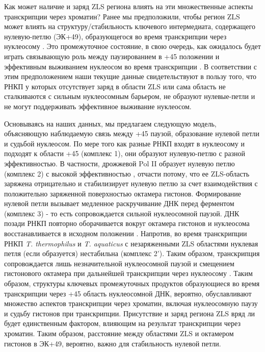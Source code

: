     Как может наличие и заряд ZLS региона влиять на эти множественные аспекты транскрипции через хроматин? Ранее мы предположили, чтобы регион ZLS может влиять на структуру/стабильность ключевого интермедиата, содержащего нулевую-петлю (ЭК+49), образующегося во время транскрипции через нуклеосому \cite{kulaeva_mechanism_2009}. Это промежуточное состояние, в свою очередь, как ожидалось будет играть связывающую роль между паузированием в +45 положении и эффективным выживанием нуклеосом во время транскрипции \cite{hsieh_histone_2010}. В соответствии с этим предположением наши текущие данные свидетельствуют в пользу того, что РНКП у которых отсутствует заряд в области ZLS или сама область не сталкиваются с сильным нуклеосомным барьером, не образуют нулевые-петли и не могут поддерживать эффективное выживание нуклеосом.
    
    Основываясь на наших данных, мы предлагаем следующую модель, объясняющую наблюдаемую связь между +45 паузой, образование нулевой петли и судьбой нуклеосом. По мере того как разные РНКП входят в нуклеосому и подходят к области +45 (комплекс 1), они образуют нулевую-петлю с разной эффективностью. В частности, дрожжевой Pol II образует нулевую петлю (комплекс 2) с высокой эффективностью \cite{kulaeva_mechanism_2009}, отчасти потому, что ее ZLS-область заряжена отрицательно и стабилизирует нулевую петлю за счет взаимодействия с положительно заряженной поверхностью октамера гистонов. Формирование нулевой петли вызывает медленное раскручивание ДНК перед ферментом (комплекс 3) - то есть сопровождается сильной нуклеосомной паузой. ДНК позади РНКП повторно оборачивается вокруг октамера гистонов и нуклеосома восстанавливается в исходном положении \cite{kulaeva_mechanism_2009}. Напротив, во время транскрипции РНКП \textit{T. thermophilus} и \textit{T. aquaticus} с незаряженными ZLS областями нуклевая петля (если образуется) нестабильна (комплекс 2'). Таким образом, транскрипция сопровождается лишь незначительной нуклеосомной паузой и смещением гистонового октамера при дальнейшей транскрипции через нуклеосому \cite{walz_sequence_1975}. Таким образом, структуры ключевых промежуточных продуктов образующиеся во время транскрипции через +45 область нуклеосомной ДНК, вероятно, обуславливают множество аспектов транскрипции через хроматин, включая нуклеосомную паузу и судьбу гистонов при транскрипции. Присутствие и заряд региона ZLS вряд ли будет единственным фактором, влияющим на результат транскрипции через хроматин. Таким образом, расстояние между областями ZLS и октамером гистонов в ЭК+49, вероятно, важно для стабильность нулевой петли.
    
